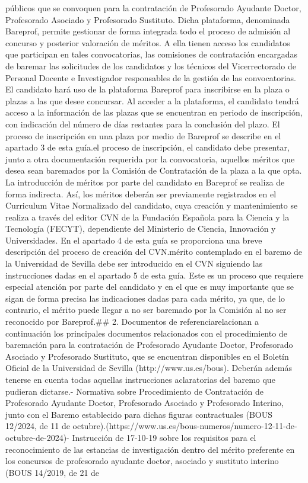 \documentclass{article}
\begin{document}
\begin{itemize}
{{públicos que se convoquen para la contratación de Profesorado Ayudante Doctor, Profesorado Asociado y Profesorado Sustituto. Dicha plataforma, denominada Bareprof, permite gestionar de forma integrada todo el proceso de admisión al concurso y posterior valoración de méritos. A ella tienen acceso los candidatos que participan en tales convocatorias, las comisiones de contratación encargadas de baremar las solicitudes de los candidatos y los técnicos del Vicerrectorado de Personal Docente e Investigador responsables de la gestión de las convocatorias. El candidato hará uso de la plataforma Bareprof para inscribirse en la plaza o plazas a las que desee concursar. Al acceder a la plataforma, el candidato tendrá acceso a la información de las plazas que se encuentran en periodo de inscripción, con indicación del número de días restantes para la conclusión del plazo. El proceso de inscripción en una plaza por medio de Bareprof se describe en el apartado 3 de esta guía.\n\nDurante el proceso de inscripción, el candidato debe presentar, junto a otra documentación requerida por la convocatoria, aquellos méritos que desea sean baremados por la Comisión de Contratación de la plaza a la que opta. La introducción de méritos por parte del candidato en Bareprof se realiza de forma indirecta. Así, los méritos deberán ser previamente registrados en el Curriculum Vitae Normalizado del candidato, cuya creación y mantenimiento se realiza a través del editor CVN de la Fundación Española para la Ciencia y la Tecnología (FECYT), dependiente del Ministerio de Ciencia, Innovación y Universidades. En el apartado 4 de esta guía se proporciona una breve descripción del proceso de creación del CVN.\n\nCada mérito contemplado en el baremo de la Universidad de Sevilla debe ser introducido en el CVN siguiendo las instrucciones dadas en el apartado 5 de esta guía. Este es un proceso que requiere especial atención por parte del candidato y en el que es muy importante que se sigan de forma precisa las indicaciones dadas para cada mérito, ya que, de lo contrario, el mérito puede llegar a no ser baremado por la Comisión al no ser reconocido por Bareprof.\n\n## 2. Documentos de referencia\n\nSe relacionan a continuación los principales documentos relacionados con el procedimiento de baremación para la contratación de Profesorado Ayudante Doctor, Profesorado Asociado y Profesorado Sustituto, que se encuentran disponibles en el Boletín Oficial de la Universidad de Sevilla (http://www.us.es/bous). Deberán además tenerse en cuenta todas aquellas instrucciones aclaratorias del baremo que pudieran dictarse.\n\n- Normativa sobre Procedimiento de Contratación de Profesorado Ayudante Doctor, Profesorado Asociado y Profesorado Interino, junto con el Baremo establecido para dichas figuras contractuales (BOUS 12/2024, de 11 de octubre).(https://www.us.es/bous-numeros/numero-12-11-de-octubre-de-2024)\n\n- Instrucción de 17-10-19 sobre los requisitos para el reconocimiento de las estancias de investigación dentro del mérito preferente en los concursos de profesorado ayudante doctor, asociado y sustituto interino (BOUS 14/2019, de 21 de }}
\end{itemize}
\end{document}
